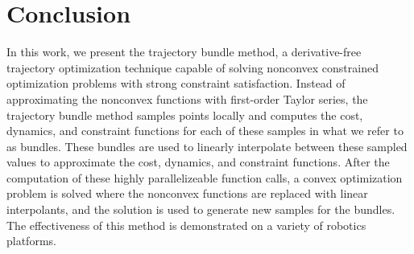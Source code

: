 \section{Conclusion}
In this work, we present the trajectory bundle method, a derivative-free trajectory optimization technique capable of solving nonconvex constrained optimization problems with strong constraint satisfaction. Instead of approximating the nonconvex functions with first-order Taylor series, the trajectory bundle method samples points locally and computes the cost, dynamics, and constraint functions for each of these samples in what we refer to as bundles. These bundles are used to linearly interpolate between these sampled values to approximate the cost, dynamics, and constraint functions. After the computation of these highly parallelizeable function calls, a convex optimization problem is solved where the nonconvex functions are replaced with linear interpolants, and the solution is used to generate new samples for the bundles.  The effectiveness of this method is demonstrated on a variety of robotics platforms.
